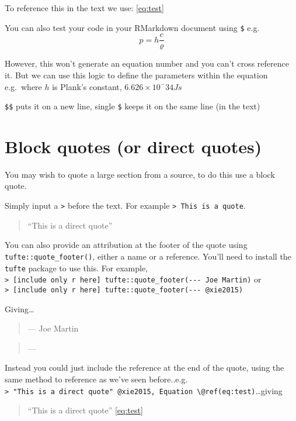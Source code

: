 \documentclass[
  12pt,
  oneside]{book}
\begin{document}
To reference this in the text we use: \eqref{eq:test}

You can also test your code in your RMarkdown document using \texttt{\$} e.g.~\[p= h\frac{c}{\varrho}\]

However, this won't generate an equation number and you can't cross reference it. But we can use this logic to define the parameters within the equation e.g.~where \(h\) is Plank's constant, \(6.626 × 10^-34 Js\)

\texttt{\$\$} puts it on a new line, single \texttt{\$} keeps it on the same line (in the text)

\hypertarget{quotes}{%
\section{Block quotes (or direct quotes)}\label{quotes}}

You may wish to quote a large section from a source, to do this use a block quote.

Simply input a \texttt{\textgreater{}} before the text. For example \texttt{\textgreater{}\ This\ is\ a\ quote}.

\begin{quote}
``This is a direct quote''
\end{quote}

You can also provide an attribution at the footer of the quote using \texttt{tufte::quote\_footer()}, either a name or a reference. You'll need to install the \texttt{tufte} package to use this. For example, \texttt{\textgreater{}\ {[}include\ only\ r\ here{]}\ tufte::quote\_footer(\textquotesingle{}-\/-\/-\ Joe\ Martin\textquotesingle{})} or \texttt{\textgreater{}\ {[}include\ only\ r\ here{]}\ tufte::quote\_footer(\textquotesingle{}-\/-\/-\ @xie2015\textquotesingle{})}

Giving\ldots{}

\begin{quote}
\hfill --- Joe Martin
\end{quote}

\begin{quote}
\hfill --- \textcite{xie2015}
\end{quote}

Instead you could just include the reference at the end of the quote, using the same method to reference as we've seen before..e.g. \texttt{\textgreater{}\ "This\ is\ a\ direct\ quote"\ @xie2015,\ Equation\ \textbackslash{}@ref(eq:test)}\ldots giving

\begin{quote}
``This is a direct quote'' \textcite{xie2015} \eqref{eq:test}
\end{quote}
\end{document}
